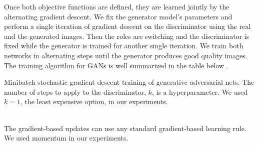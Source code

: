 \documentclass[11pt,a4paper,openany]{book}
\begin{document}
\noindent Once both objective functions are defined, they are learned jointly by the alternating gradient descent. We fix the generator model’s parameters and perform a single iteration of gradient descent on the discriminator using the real and the generated images. Then the roles are switching and the discriminator is fixed while the generator is trained for another single iteration. We train both networks in alternating steps until the generator produces good quality images. The training algorithm for GANs is well summarized in the table below  \cite{gan}.

\begin{algorithm}[H]
\caption{\small Minibatch stochastic gradient descent training of generative adversarial nets.
The number of steps to apply to the discriminator, $k$, is a hyperparameter. We used $k=1$, the
least expensive option, in our experiments.
}
\begin{algorithmic}
\label{alg:AGF}
   \ENDFOR
  \ENDFOR
  \\The gradient-based updates can use any standard gradient-based learning rule. We used momentum in our experiments.
\end{algorithmic}
\end{algorithm}
\end{document}
